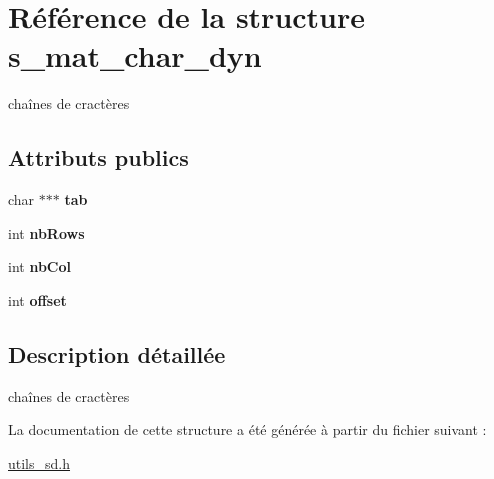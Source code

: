 \hypertarget{structs__mat__char__dyn}{}\section{Référence de la structure s\+\_\+mat\+\_\+char\+\_\+dyn}
\label{structs__mat__char__dyn}


chaînes de cractères  


\subsection*{Attributs publics}
\begin{DoxyCompactItemize}
\item 
\mbox{\label{structs__mat__char__dyn_abd4d6f6e0cb1c98d13d723e9f98ce3f8}} 
char $\ast$$\ast$$\ast$ {\bfseries tab}
\item 
\mbox{\label{structs__mat__char__dyn_ad9f0887072dd695f4c38db51d29fe877}} 
int {\bfseries nb\+Rows}
\item 
\mbox{\label{structs__mat__char__dyn_a26a5e3dc22413338e62bcdf9c6de1c87}} 
int {\bfseries nb\+Col}
\item 
\mbox{\label{structs__mat__char__dyn_a2018301fd78ef68060d8973465ba5803}} 
int {\bfseries offset}
\end{DoxyCompactItemize}


\subsection{Description détaillée}
chaînes de cractères 

La documentation de cette structure a été générée à partir du fichier suivant \+:\begin{DoxyCompactItemize}
\item 
\hyperlink{utils__sd_8h}{utils\+\_\+sd.\+h}\end{DoxyCompactItemize}
